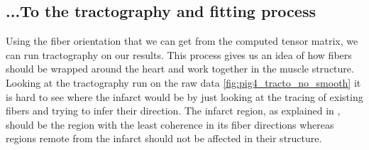 \subsection{...To the tractography and fitting process}

Using the fiber orientation that we can get from the computed tensor matrix, we can run tractography on our results. This process gives us an idea of how fibers should be wrapped around the heart and work together in the muscle structure. Looking at the tractography run on the raw data \ref{fig:pig4_tracto_no_smooth} it is hard to see where the infarct would be by just looking at the tracing of existing fibers and trying to infer their direction. The infarct region, as explained in \cite{wu2007mr}, should be the region with the least coherence in its fiber directions whereas regions remote from the infarct should not be affected in their structure.


